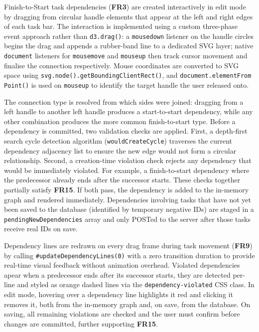 \documentclass[12pt,nonacm,acmlarge,titlepage,screen]{acmart}
\begin{document}
Finish-to-Start task dependencies (\textbf{FR3}\label{fr:3-impl}) are created interactively
in edit mode by dragging from circular handle elements that appear at the left and right
edges of each task bar. The interaction is implemented using a custom three-phase event
approach rather than \texttt{d3.drag()}: a \texttt{mousedown} \cite{bostock_d3, geeksforgeeks_d3js_2025, w3schools_d3js_2025} listener on the handle circles
begins the drag and appends a rubber-band line to a dedicated SVG layer; native
\texttt{document} listeners for \texttt{mousemove} and \texttt{mouseup} then track cursor
movement and finalise the connection respectively. Mouse coordinates are converted to SVG
space using \texttt{svg.node().getBoundingClientRect()}, and \texttt{document.elementFrom%
Point()} \cite{w3schools_getboundingclientrect} is used on \texttt{mouseup} to identify the target handle the user released onto.

The connection type is resolved from which sides were joined: dragging from a left handle to
another left handle produces a start-to-start dependency, while any other combination
produces the more common finish-to-start type. Before a dependency is committed, two
validation checks are applied. First, a depth-first search cycle detection algorithm
(\texttt{wouldCreateCycle}) traverses the current dependency adjacency list to ensure the
new edge would not form a circular relationship. Second, a creation-time violation check
rejects any dependency that would be immediately violated. For example, a finish-to-start
dependency where the predecessor already ends after the successor starts. These checks
together partially satisfy \textbf{FR15}\label{fr:15}. If both pass, the dependency is added
to the in-memory graph and rendered immediately. Dependencies involving tasks that have not
yet been saved to the database (identified by temporary negative IDs) are staged in a
\texttt{pendingNewDependencies} array and only POSTed to the server after those tasks
receive real IDs on save.

Dependency lines are redrawn on every drag frame during task movement (\textbf{FR9}\label{fr:9}) 
by calling \texttt{\#updateDependencyLines(0)} with a zero transition duration
to provide real-time visual feedback without animation overhead. Violated dependencies apear
when a predecessor ends after its successor starts, they are detected per-line and styled as
orange dashed lines via the \texttt{dependency-violated} CSS class. In edit mode, hovering
over a dependency line highlights it red and clicking it removes it, both from the in-memory
graph and, on save, from the database. On saving, all remaining violations are checked and
the user must confirm before changes are committed, further supporting
\textbf{FR15}\label{fr:15-save}.
\end{document}
